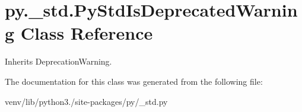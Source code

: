 \hypertarget{classpy_1_1__std_1_1_py_std_is_deprecated_warning}{}\section{py.\+\_\+std.\+Py\+Std\+Is\+Deprecated\+Warning Class Reference}
\label{classpy_1_1__std_1_1_py_std_is_deprecated_warning}


Inherits Deprecation\+Warning.



The documentation for this class was generated from the following file\+:\begin{DoxyCompactItemize}
\item 
venv/lib/python3./site-\/packages/py/\+\_\+std.\+py\end{DoxyCompactItemize}
